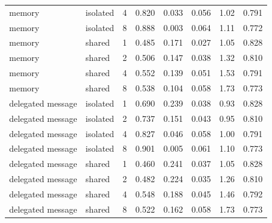 \begin{table}[!ht]
{\begin{tabular}{llcccccc}
memory & isolated & 4 & 0.820 & 0.033 & 0.056 & 1.02 & 0.791 \\
memory & isolated & 8 & 0.888 & 0.003 & 0.064 & 1.11 & 0.772 \\
memory & shared & 1 & 0.485 & 0.171 & 0.027 & 1.05 & 0.828 \\
memory & shared & 2 & 0.506 & 0.147 & 0.038 & 1.32 & 0.810 \\
memory & shared & 4 & 0.552 & 0.139 & 0.051 & 1.53 & 0.791 \\
memory & shared & 8 & 0.538 & 0.104 & 0.058 & 1.73 & 0.773 \\
delegated message & isolated & 1 & 0.690 & 0.239 & 0.038 & 0.93 & 0.828 \\
delegated message & isolated & 2 & 0.737 & 0.151 & 0.043 & 0.95 & 0.810 \\
delegated message & isolated & 4 & 0.827 & 0.046 & 0.058 & 1.00 & 0.791 \\
delegated message & isolated & 8 & 0.901 & 0.005 & 0.061 & 1.10 & 0.773 \\
delegated message & shared & 1 & 0.460 & 0.241 & 0.037 & 1.05 & 0.828 \\
delegated message & shared & 2 & 0.482 & 0.224 & 0.035 & 1.26 & 0.810 \\
delegated message & shared & 4 & 0.548 & 0.188 & 0.045 & 1.46 & 0.792 \\
delegated message & shared & 8 & 0.522 & 0.162 & 0.058 & 1.73 & 0.773 \\
\bottomrule
\end{tabular}}
\end{table}